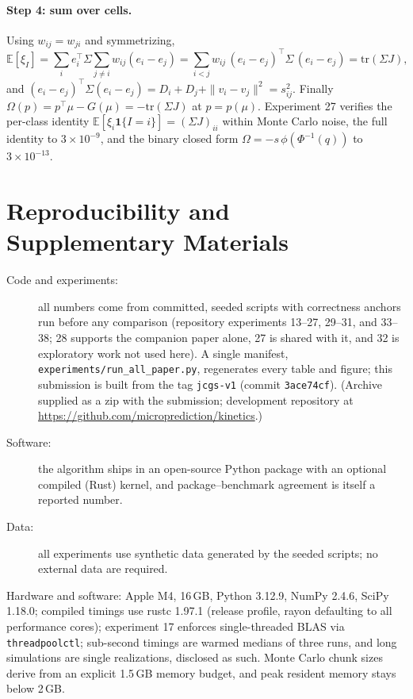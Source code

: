 \documentclass[12pt]{article}
\theoremstyle{remark}
\newcommand{\E}{\mathbb{E}}
\begin{document}
\paragraph{Step 4: sum over cells.} Using $w_{ij} = w_{ji}$ and
symmetrizing,
\[
\E[\xi_I] = \sum_i e_i^\top \Sigma \sum_{j\ne i} w_{ij}(e_i - e_j)
= \sum_{i<j} w_{ij}\, (e_i - e_j)^\top \Sigma\, (e_i - e_j)
= \mathrm{tr}(\Sigma J),
\]
and $(e_i - e_j)^\top \Sigma (e_i - e_j) = D_i + D_j + \|v_i -
v_j\|^2 = s_{ij}^2$. Finally $\Omega(p) = p^\top \mu - G(\mu) =
-\mathrm{tr}(\Sigma J)$ at $p = p(\mu)$. Experiment 27 verifies the
per-class identity $\E[\xi_i \mathbf{1}\{I=i\}] = (\Sigma J)_{ii}$
within Monte Carlo noise, the full identity to $3\times10^{-9}$, and
the binary closed form $\Omega = -s\,\phi(\Phi^{-1}(q))$ to
$3\times10^{-13}$.

\section*{Reproducibility and Supplementary Materials}
\sloppy

\begin{description}
\item[Code and experiments:] all numbers come from committed, seeded
scripts with correctness anchors run before any comparison (repository
experiments 13--27, 29--31, and 33--38; 28 supports the companion
paper alone, 27 is shared with it, and 32 is exploratory work not used
here).
A single manifest,
\texttt{experiments/run\_all\_paper.py}, regenerates every table and
figure; this submission is built from the tag
\texttt{jcgs-v1} (commit \texttt{3ace74cf}). (Archive supplied as a zip with
the submission; development repository at
\url{https://github.com/microprediction/kinetics}.)
\item[Software:] the algorithm ships in an open-source Python package
with an optional compiled (Rust) kernel, and package--benchmark agreement
is itself a reported number.
\item[Data:] all experiments use synthetic data generated by the seeded
scripts; no external data are required.
\end{description}

Hardware and software: Apple M4, 16\,GB, Python 3.12.9,
NumPy 2.4.6, SciPy 1.18.0; compiled timings use rustc 1.97.1
(release profile, rayon defaulting to all performance cores); experiment 17 enforces single-threaded BLAS via
\texttt{threadpoolctl}; sub-second timings are warmed medians of three
runs, and long simulations are single realizations, disclosed as such.
Monte Carlo chunk sizes derive from an explicit 1.5\,GB memory budget, and
peak resident memory stays below 2\,GB.
\end{document}
